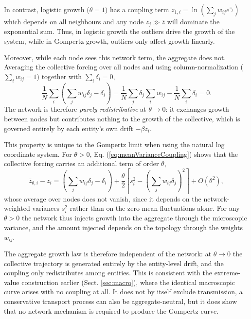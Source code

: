 \documentclass{article}
\begin{document}
In contrast, logistic growth ($\theta=1$) has a coupling term $\bar{z}_{1,i}=\ln(\sum_j w_{ij} e^{z_j})$ which depends on all neighbours and any node $z_j \gg \bar{z}$ will dominate the exponential sum. Thus, in logistic growth the outliers drive the growth of the system, while in Gompertz growth, outliers only affect growth linearly. 

Moreover, while each node sees this network term, the aggregate does not. Averaging the collective forcing over all nodes and using column-normalization ($\sum_i w_{ij} = 1$) together with $\sum_i \delta_i = 0$,
\begin{equation}
\frac{1}{N}\sum_i \left(\sum_j w_{ij} \delta_j - \delta_i\right)
= \frac{1}{N}\sum_j \delta_j \sum_i w_{ij} - \frac{1}{N}\sum_i \delta_i = 0.
\label{eq:redistributive}
\end{equation}
 The network is therefore \emph{purely redistributive} at $\theta \to 0$: it exchanges growth between nodes but contributes nothing to the growth of the collective, which is governed entirely by each entity's own drift $-\beta z_i$.

This property is unique to the Gompertz limit when using the natural log coordinate system. For $\theta > 0$, Eq. (\ref{eq:meanVarianceCoupling}) shows that the collective forcing carries an additional term of order $\theta$,
\begin{equation}
\bar{z}_{\theta,i} - z_i = \left(\sum_j w_{ij}\delta_j - \delta_i\right) + \frac{\theta}{2}\left[s_i^2 - \left(\sum_j w_{ij}\delta_j\right)^2\right] + O(\theta^2),
\end{equation}
whose average over nodes does not vanish, since it depends on the network-weighted variances $s_i^2$ rather than on the zero-mean fluctuations alone. For any $\theta > 0$ the network thus injects growth into the aggregate through the microscopic variance, and the amount injected depends on the topology through the weights $w_{ij}$.

The aggregate growth law is therefore independent of the network: at $\theta \rightarrow 0$ the collective trajectory is generated entirely by the entity-level drift, and the coupling only redistributes among entities. This is consistent with the extreme-value construction earlier (Sect. \ref{sec:macro}), where the identical macroscopic curve arises with no coupling at all. It does not by itself exclude transmission, a conservative transport process can also be aggregate-neutral, but it does show that no network mechanism is required to produce the Gompertz curve.
\end{document}
